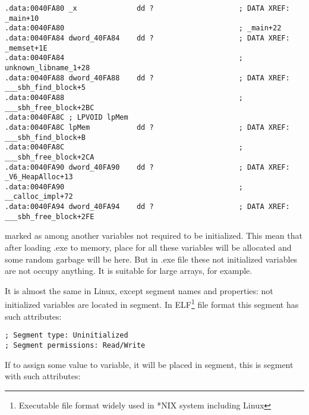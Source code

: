 \begin{lstlisting}
.data:0040FA80 _x              dd ?                    ; DATA XREF: _main+10
.data:0040FA80                                         ; _main+22
.data:0040FA84 dword_40FA84    dd ?                    ; DATA XREF: _memset+1E
.data:0040FA84                                         ; unknown_libname_1+28
.data:0040FA88 dword_40FA88    dd ?                    ; DATA XREF: ___sbh_find_block+5
.data:0040FA88                                         ; ___sbh_free_block+2BC
.data:0040FA8C ; LPVOID lpMem
.data:0040FA8C lpMem           dd ?                    ; DATA XREF: ___sbh_find_block+B
.data:0040FA8C                                         ; ___sbh_free_block+2CA
.data:0040FA90 dword_40FA90    dd ?                    ; DATA XREF: _V6_HeapAlloc+13
.data:0040FA90                                         ; __calloc_impl+72
.data:0040FA94 dword_40FA94    dd ?                    ; DATA XREF: ___sbh_free_block+2FE
\end{lstlisting}

{ marked as  among another variables not required to be initialized. 
This mean that after loading .exe to memory, place for all these variables will be 
allocated and some random garbage will be here. 
But in .exe file these not initialized variables are not occupy anything. 
It is suitable for large arrays, for example.}

{It is almost the same in Linux, except segment names and properties: 
not initialized variables are located in  segment. 
In ELF\footnote{Executable file format widely used in *NIX system including Linux} 
file format this segment has such attributes:}

\begin{lstlisting}
; Segment type: Uninitialized
; Segment permissions: Read/Write
\end{lstlisting}

{If to assign some value to variable, it will be placed in  segment, 
this is segment with such attributes:}

